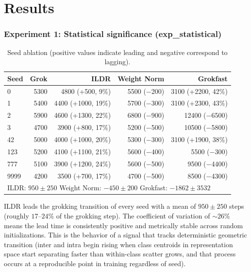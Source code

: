 \documentclass{article}
\begin{document}
\section{Results}


\subsubsection{Experiment 1: Statistical significance (exp\_statistical)}

\begin{table}[H]
\centering
\begin{tabular}{lrrrr}
\hline
Seed & Grok & ILDR & Weight Norm & Grokfast \\
\hline
0    & 5300 & 4800 (+500, 9\%)   & 5500 ($-$200)       & 3100 (+2200, 42\%) \\
1    & 5400 & 4400 (+1000, 19\%) & 5700 ($-$300)       & 3100 (+2300, 43\%) \\
2    & 5900 & 4600 (+1300, 22\%) & 6800 ($-$900)       & 12400 ($-$6500)    \\
3    & 4700 & 3900 (+800, 17\%)  & 5200 ($-$500)       & 10500 ($-$5800)    \\
42   & 5000 & 4000 (+1000, 20\%) & 5300 ($-$300)       & 3100 (+1900, 38\%) \\
123  & 5200 & 4100 (+1100, 21\%) & 5600 ($-$400)       & 5500 ($-$300)      \\
777  & 5100 & 3900 (+1200, 24\%) & 5600 ($-$500)       & 9500 ($-$4400)     \\
9999 & 4200 & 3500 (+700, 17\%)  & 4700 ($-$500)       & 8500 ($-$4300)     \\
\hline
\multicolumn{5}{l}{%
  ILDR: $950 \pm 250$ \quad
  Weight Norm: $-450 \pm 200$ \quad
  Grokfast: $-1862 \pm 3532$} \\
\hline
\end{tabular}
\caption{Seed ablation (positive values indicate leading and negative correspond to lagging).}
\label{tab:seed_ablation}
\end{table}

ILDR leads the grokking transition of every seed with a mean of $950 \pm 250$ steps (roughly $17\text{--}24\%$ of the grokking step). The coefficient of variation of $\sim 26\%$ means the lead time is consistently positive and metrically stable across random initializations. This is the behavior of a signal that tracks deterministic geometric transition (inter and intra begin rising when class centroids in representation space start separating faster than within-class scatter grows, and that process occurs at a reproducible point in training regardless of seed).
\end{document}
